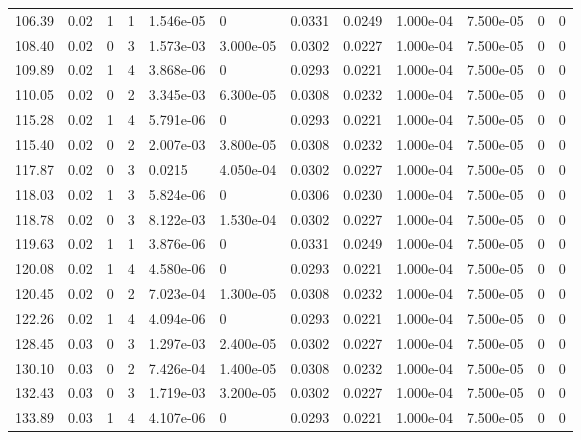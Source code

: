 \documentclass[preview]{standalone}
\begin{document}
{{{\begin{tabular}{L{1.2cm}C{1.2cm} C{0.3cm}C{0.5cm} C{1.4cm}C{1.4cm} C{1.4cm}C{1.4cm} C{1.6cm}C{1.6cm} C{1.6cm}C{1.6cm}}
  106.39  &  0.02  & 1     &  1 &  1.546e-05  & 0  &  0.0331&   0.0249& 1.000e-04 & 7.500e-05   &  0 & 0  \\ 
  108.40  &  0.02  & 0     &  3 &  1.573e-03  & 3.000e-05  &  0.0302&   0.0227& 1.000e-04 & 7.500e-05   &  0 & 0  \\ 
  109.89  &  0.02  & 1     &  4 &  3.868e-06  & 0  &  0.0293&   0.0221& 1.000e-04 & 7.500e-05   &  0 & 0  \\ 
  110.05  &  0.02  & 0     &  2 &  3.345e-03  & 6.300e-05  &  0.0308&   0.0232& 1.000e-04 & 7.500e-05   &  0 & 0  \\ 
  115.28  &  0.02  & 1     &  4 &  5.791e-06  & 0  &  0.0293&   0.0221& 1.000e-04 & 7.500e-05   &  0 & 0  \\ 
  115.40  &  0.02  & 0     &  2 &  2.007e-03  & 3.800e-05  &  0.0308&   0.0232& 1.000e-04 & 7.500e-05   &  0 & 0  \\ 
  117.87  &  0.02  & 0     &  3 &  0.0215  & 4.050e-04  &  0.0302&   0.0227& 1.000e-04 & 7.500e-05   &  0 & 0  \\ 
  118.03  &  0.02  & 1     &  3 &  5.824e-06  & 0  &  0.0306&   0.0230& 1.000e-04 & 7.500e-05   &  0 & 0  \\ 
  118.78  &  0.02  & 0     &  3 &  8.122e-03  & 1.530e-04  &  0.0302&   0.0227& 1.000e-04 & 7.500e-05   &  0 & 0  \\ 
  119.63  &  0.02  & 1     &  1 &  3.876e-06  & 0  &  0.0331&   0.0249& 1.000e-04 & 7.500e-05   &  0 & 0  \\ 
  120.08  &  0.02  & 1     &  4 &  4.580e-06  & 0  &  0.0293&   0.0221& 1.000e-04 & 7.500e-05   &  0 & 0  \\ 
  120.45  &  0.02  & 0     &  2 &  7.023e-04  & 1.300e-05  &  0.0308&   0.0232& 1.000e-04 & 7.500e-05   &  0 & 0  \\ 
  122.26  &  0.02  & 1     &  4 &  4.094e-06  & 0  &  0.0293&   0.0221& 1.000e-04 & 7.500e-05   &  0 & 0  \\ 
  128.45  &  0.03  & 0     &  3 &  1.297e-03  & 2.400e-05  &  0.0302&   0.0227& 1.000e-04 & 7.500e-05   &  0 & 0  \\ 
  130.10  &  0.03  & 0     &  2 &  7.426e-04  & 1.400e-05  &  0.0308&   0.0232& 1.000e-04 & 7.500e-05   &  0 & 0  \\ 
  132.43  &  0.03  & 0     &  3 &  1.719e-03  & 3.200e-05  &  0.0302&   0.0227& 1.000e-04 & 7.500e-05   &  0 & 0  \\ 
  133.89  &  0.03  & 1     &  4 &  4.107e-06  & 0  &  0.0293&   0.0221& 1.000e-04 & 7.500e-05   &  0 & 0  \\ 

\end{tabular}}}}
\end{document}
